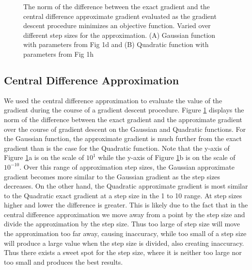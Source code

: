 \documentclass[10pt]{article}
\begin{document}
\begin{figure}[!h]
\centering
{}

\caption{The norm of the difference between the exact gradient and the central difference approximate gradient evaluated as the gradient descent procedure minimizes an objective function. Varied over different step sizes for the approximation. (A) Gaussian function with parameters from Fig 1d and (B) Quadratic function with parameters from Fig 1h}
\label{fig:1.2}
\end{figure}


\subsection{Central Difference Approximation}

 We used the central difference approximation to evaluate the value of the gradient during the course of a gradient descent procedure. Figure \ref{fig:1.2} displays the norm of the difference between the exact gradient and the approximate gradient over the course of gradient descent on the Gaussian and Quadratic functions. For the Gaussian function, the approximate gradient is much further from the exact gradient than is the case for the Quadratic function. Note that the y-axis of Figure \ref{fig:1.2}a is on the scale of $10^1$ while the y-axis of Figure \ref{fig:1.2}b is on the scale of $10^{-10}$. Over this range of approximation step sizes, the Gaussian approximate gradient becomes more similar to the Gaussian gradient as the step sizes decreases. On the other hand, the Quadratic approximate gradient is most similar to the Quadratic exact gradient at a step size in the 1 to 10 range. At step sizes higher and lower the difference is greater. This is likely due to the fact that in the central difference approximation we move away from a point by the step size and divide the approximation by the step size. Thus too large of step size will move the approximation too far away, causing inaccuracy, while too small of a step size will produce a large value when the step size is divided, also creating inaccuracy. Thus there exists a sweet spot for the step size, where it is neither too large nor too small and produces the best results. 
\end{document}
